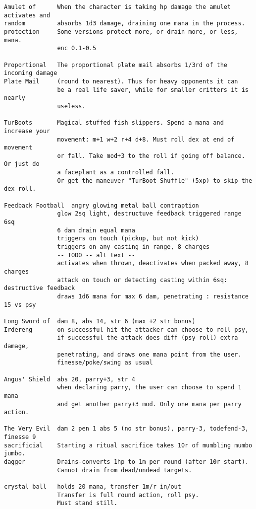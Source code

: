 \begin{verbatim}
Amulet of      When the character is taking hp damage the amulet activates and
random         absorbs 1d3 damage, draining one mana in the process.
protection     Some versions protect more, or drain more, or less, mana.
               enc 0.1-0.5

Proportional   The proportional plate mail absorbs 1/3rd of the incoming damage
Plate Mail     (round to nearest). Thus for heavy opponents it can
               be a real life saver, while for smaller critters it is nearly
               useless.

TurBoots       Magical stuffed fish slippers. Spend a mana and increase your
               movement: m+1 w+2 r+4 d+8. Must roll dex at end of movement 
               or fall. Take mod+3 to the roll if going off balance. Or just do 
               a faceplant as a controlled fall.
               Or get the maneuver "TurBoot Shuffle" (5xp) to skip the dex roll.

Feedback Football  angry glowing metal ball contraption
               glow 2sq light, destructuve feedback triggered range 6sq
               6 dam drain equal mana
               triggers on touch (pickup, but not kick)
               triggers on any casting in range, 8 charges
               -- TODO -- alt text --
               activates when thrown, deactivates when packed away, 8 charges
               attack on touch or detecting casting within 6sq: destructive feedback
               draws 1d6 mana for max 6 dam, penetrating : resistance 15 vs psy

Long Sword of  dam 8, abs 14, str 6 (max +2 str bonus)
Irdereng       on successful hit the attacker can choose to roll psy,
               if successful the attack does diff (psy roll) extra damage,
               penetrating, and draws one mana point from the user.
               finesse/poke/swing as usual

Angus' Shield  abs 20, parry+3, str 4
               when declaring parry, the user can choose to spend 1 mana
               and get another parry+3 mod. Only one mana per parry action.

The Very Evil  dam 2 pen 1 abs 5 (no str bonus), parry-3, todefend-3, finesse 9
sacrificial    Starting a ritual sacrifice takes 10r of mumbling mumbo jumbo.
dagger         Drains-converts 1hp to 1m per round (after 10r start).
               Cannot drain from dead/undead targets.

crystal ball   holds 20 mana, transfer 1m/r in/out
               Transfer is full round action, roll psy.
               Must stand still.


\end{verbatim}
